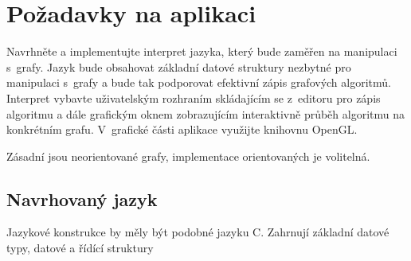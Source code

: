 \documentclass[11pt,twoside,a4paper]{book}
\begin{document}
\section{Požadavky na aplikaci}

Navrhněte a implementujte interpret jazyka, který bude zaměřen na manipulaci s~grafy. Jazyk bude obsahovat základní datové struktury nezbytné pro manipulaci s~grafy a bude tak podporovat efektivní zápis grafových algoritmů. Interpret vybavte uživatelským rozhraním skládajícím se z~editoru pro zápis algoritmu a dále grafickým oknem zobrazujícím interaktivně průběh algoritmu na konkrétním grafu. V~grafické části aplikace využijte knihovnu OpenGL.

Zásadní jsou neorientované grafy, implementace orientovaných je volitelná.

\subsection{Navrhovaný jazyk}

Jazykové konstrukce by měly být podobné jazyku C. Zahrnují základní datové typy, datové a řídící struktury
\end{document}
